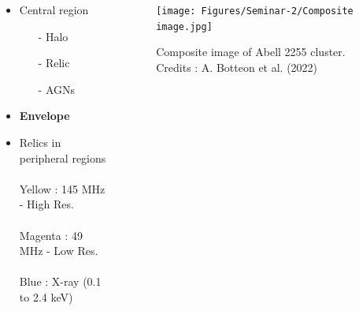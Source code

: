 \documentclass[aspectratio=169]{beamer}
\begin{document}
\begin{markdown}
\begin{frame}{}

\begin{columns}
    \begin{column}{0.3\textwidth} 
         \begin{itemize}
             \item Central region
                \begin{itemize}
                    \item[-] Halo
                    \item[-] Relic
                    \item[-] AGNs
                \end{itemize} 
             \item {\textbf{Envelope}}
             \item Relics in peripheral regions 
             \\\\ \vspace{16mm} \hspace{-4mm}
             \scriptsize{
             Yellow : 145 MHz - High Res. \\\\ \hspace{-3mm}
             Magenta : 49 MHz - Low Res.\\\\ \hspace{-3mm}
             Blue : X-ray (0.1 to 2.4 keV)}
        \end{itemize}
    \end{column}
    \begin{column}{0.8\textwidth}
         \vspace{-2mm}
          \begin{figure}[!htbp]
          \centering
          \texttt{[image: Figures/Seminar-2/Composite image.jpg]}
          \vspace*{-3mm}
          \caption{Composite image of Abell 2255 cluster. Credits :  A. Botteon et al. (2022)}
          \label{}
        \end{figure}
    \end{column}
\end{columns}

    
\end{frame}



\end{markdown}
\end{document}
